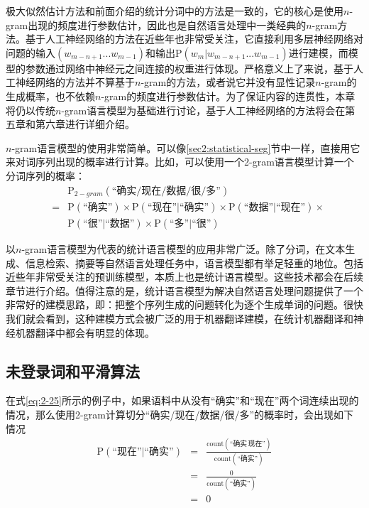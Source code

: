 \parinterval 极大似然估计方法和前面介绍的统计分词中的方法是一致的，它的核心是使用$n$-gram出现的频度进行参数估计，因此也是自然语言处理中一类经典的$n$-gram方法。基于人工神经网络的方法在近些年也非常受关注，它直接利用多层神经网络对问题的输入$(w_{m-n+1}...w_{m-1})$和输出$\textrm{P}(w_m|w_{m-n+1} ... w_{m-1})$进行建模，而模型的参数通过网络中神经元之间连接的权重进行体现。严格意义上了来说，基于人工神经网络的方法并不算基于$n$-gram的方法，或者说它并没有显性记录$n$-gram的生成概率，也不依赖$n$-gram的频度进行参数估计。为了保证内容的连贯性，本章将仍以传统$n$-gram语言模型为基础进行讨论，基于人工神经网络的方法将会在第五章和第六章进行详细介绍。

\parinterval $n$-gram语言模型的使用非常简单。可以像\ref{sec2:statistical-seg}节中一样，直接用它来对词序列出现的概率进行计算。比如，可以使用一个2-gram语言模型计算一个分词序列的概率：
\begin{eqnarray}
 & &\textrm{P}_{2-gram}{(\textrm{``确实}/\textrm{现在}/\textrm{数据}/\textrm{很}/\textrm{多''})} \nonumber \\
&= & \textrm{P}(\textrm{``确实''}) \times\textrm{P}(\textrm{``现在''}|\textrm{``确实''})\times\textrm{P}(\textrm{``数据''}|\textrm{``现在''}) \times \nonumber \\
&  & \textrm{P}(\textrm{``很''}|\textrm{``数据''})\times\textrm{P}(\textrm{``多''}|\textrm{``很''})
\label{eq:2-25}
\end{eqnarray}

\parinterval 以$n$-gram语言模型为代表的统计语言模型的应用非常广泛。除了分词，在文本生成、信息检索、摘要等自然语言处理任务中，语言模型都有举足轻重的地位。包括近些年非常受关注的预训练模型，本质上也是统计语言模型。这些技术都会在后续章节进行介绍。值得注意的是，统计语言模型为解决自然语言处理问题提供了一个非常好的建模思路，即：把整个序列生成的问题转化为逐个生成单词的问题。很快我们就会看到，这种建模方式会被广泛的用于机器翻译建模，在统计机器翻译和神经机器翻译中都会有明显的体现。


\subsection{未登录词和平滑算法}\label{sec2:smoothing}

\parinterval 在式\ref{eq:2-25}所示的例子中，如果语料中从没有``确实''和``现在''两个词连续出现的情况，那么使用2-gram计算切分``确实/现在/数据/很/多''的概率时，会出现如下情况
\begin{eqnarray}
\textrm{P}(\textrm{``现在''}|\textrm{``确实''}) & =  & \frac{\textrm{count}(\textrm{``确实}\,\textrm{现在''})}{\textrm{count}(\textrm{``确实''})} \nonumber \\
                                                                     & =  & \frac{0}{\textrm{count}(\textrm{``确实''})} \nonumber \\
                                                                     & =  & 0
\label{eq:2-26}
\end{eqnarray}

